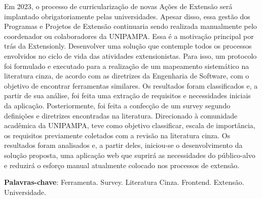 \begin{resumo}
 Em 2023, o processo de curricularização de novas Ações de Extensão será implantado obrigatoriamente pelas universidades. Apesar disso, essa gestão dos Programas e Projetos de Extensão continuaria sendo realizada manualmente pelo coordenador ou colaboradores da \acs{UNIPAMPA}. Essa é a motivação principal por trás da Extensionly. Desenvolver uma solução que contemple todos os processos envolvidos no ciclo de vida das atividades extensionistas. Para isso, um protocolo foi formulado e executado para a realização de um mapeamento sistemático na literatura cinza, de acordo com as diretrizes da Engenharia de Software, com o objetivo de encontrar ferramentas similares. Os resultados foram classificados e, a partir de sua análise, foi feita uma extração de requisitos e necessidades iniciais da aplicação. Posteriormente, foi feita a confecção de um survey segundo definições e diretrizes encontradas na literatura. Direcionado à comunidade acadêmica da \ac{UNIPAMPA}, teve como objetivo classificar, escala de importância, os requisitos previamente coletados com a revisão na literatura cinza. Os resultados foram analisados e, a partir deles, iniciou-se o desenvolvimento da solução proposta, uma aplicação web que suprirá as necessidades do público-alvo e reduzirá o esforço manual atualmente colocado nos processos de extensão.
 

 \vspace{\onelineskip}
    
 \noindent
 \textbf{Palavras-chave}: Ferramenta. Survey. Literatura Cinza. Frontend. Extensão. Universidade.
\end{resumo}
